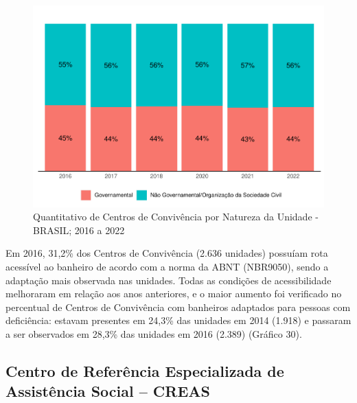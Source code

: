 \documentclass[
  brazilian]{report}
\begin{document}
\begin{figure}
\includegraphics{Censo-SUAS-2022_files/figure-latex/centro-conv-natureza-1} \caption[Quantitativo de Centros de Convivência por Natureza da Unidade - BRASIL]{Quantitativo de Centros de Convivência por Natureza da Unidade - BRASIL; 2016 a 2022}\label{fig:centro-conv-natureza}
\end{figure}

Em 2016, 31,2\% dos Centros de Convivência (2.636 unidades) possuíam
rota acessível ao banheiro de acordo com a norma da ABNT (NBR9050),
sendo a adaptação mais observada nas unidades. Todas as condições de
acessibilidade melhoraram em relação aos anos anteriores, e o maior
aumento foi verificado no percentual de Centros de Convivência com
banheiros adaptados para pessoas com deficiência: estavam presentes em
24,3\% das unidades em 2014 (1.918) e passaram a ser observados em
28,3\% das unidades em 2016 (2.389) (Gráfico 30).

\hypertarget{centro-de-referuxeancia-especializada-de-assistuxeancia-social-creas}{%
\subsection{Centro de Referência Especializada de Assistência Social --
CREAS}\label{centro-de-referuxeancia-especializada-de-assistuxeancia-social-creas}}
\end{document}

